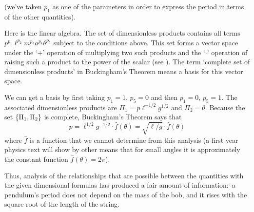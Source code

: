 (we've taken $p_1$ as one of the parameters in order to express
the period in terms of the other quantities).

Here is the linear algebra.
The set of dimensionless products 
contains all terms $p^{p_1}\ell^{p_2}m^{p_3}a^{p_4}\theta^{p_5}$ subject
to the conditions above.
This set forms a vector space under the 
`$+$' operation of multiplying two such products 
and the `$\cdot$' operation of raising 
such a product to the power of the scalar
(see ).
The term `complete set of dimensionless products' 
in Buckingham's Theorem means a basis for this vector space.

We can get a basis 
by first taking $p_1=1$, $p_5=0$ and then $p_1=0$, $p_5=1$.
The associated dimensionless 
products are $\Pi_1=p\ell^{-1/2}g^{1/2}$ and $\Pi_2=\theta$.
Because the set $\mbox{$\{\Pi_1,\Pi_2\}$}$ is complete, 
Buckingham's Theorem says that
\begin{equation*}
  p = \ell^{1/2}g^{-1/2}\cdot\hat{f}(\theta) 
    = \sqrt{\ell/g}\cdot\hat{f}(\theta)
\end{equation*}
where $\hat{f}$ is a function that we cannot determine from this analysis
(a first year physics text will show by other means 
that for small angles it is approximately the constant
function $\hat{f}(\theta)=2\pi$).

Thus, analysis of the relationships that are possible between the
quantities with the given dimensional formulas 
has produced a fair amount of information:~a pendulum's period does not 
depend on the mass of the bob, 
and it rises with the square root of the length of the string.

